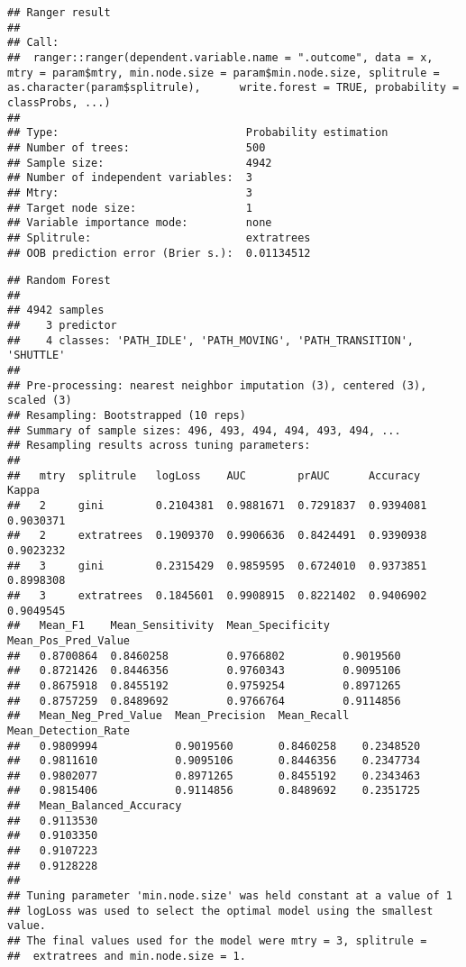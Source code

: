 \documentclass[]{article}
\begin{document}
\begin{verbatim}
## Ranger result
## 
## Call:
##  ranger::ranger(dependent.variable.name = ".outcome", data = x,      mtry = param$mtry, min.node.size = param$min.node.size, splitrule = as.character(param$splitrule),      write.forest = TRUE, probability = classProbs, ...) 
## 
## Type:                             Probability estimation 
## Number of trees:                  500 
## Sample size:                      4942 
## Number of independent variables:  3 
## Mtry:                             3 
## Target node size:                 1 
## Variable importance mode:         none 
## Splitrule:                        extratrees 
## OOB prediction error (Brier s.):  0.01134512
\end{verbatim}

\begin{verbatim}
## Random Forest 
## 
## 4942 samples
##    3 predictor
##    4 classes: 'PATH_IDLE', 'PATH_MOVING', 'PATH_TRANSITION', 'SHUTTLE' 
## 
## Pre-processing: nearest neighbor imputation (3), centered (3), scaled (3) 
## Resampling: Bootstrapped (10 reps) 
## Summary of sample sizes: 496, 493, 494, 494, 493, 494, ... 
## Resampling results across tuning parameters:
## 
##   mtry  splitrule   logLoss    AUC        prAUC      Accuracy   Kappa    
##   2     gini        0.2104381  0.9881671  0.7291837  0.9394081  0.9030371
##   2     extratrees  0.1909370  0.9906636  0.8424491  0.9390938  0.9023232
##   3     gini        0.2315429  0.9859595  0.6724010  0.9373851  0.8998308
##   3     extratrees  0.1845601  0.9908915  0.8221402  0.9406902  0.9049545
##   Mean_F1    Mean_Sensitivity  Mean_Specificity  Mean_Pos_Pred_Value
##   0.8700864  0.8460258         0.9766802         0.9019560          
##   0.8721426  0.8446356         0.9760343         0.9095106          
##   0.8675918  0.8455192         0.9759254         0.8971265          
##   0.8757259  0.8489692         0.9766764         0.9114856          
##   Mean_Neg_Pred_Value  Mean_Precision  Mean_Recall  Mean_Detection_Rate
##   0.9809994            0.9019560       0.8460258    0.2348520          
##   0.9811610            0.9095106       0.8446356    0.2347734          
##   0.9802077            0.8971265       0.8455192    0.2343463          
##   0.9815406            0.9114856       0.8489692    0.2351725          
##   Mean_Balanced_Accuracy
##   0.9113530             
##   0.9103350             
##   0.9107223             
##   0.9128228             
## 
## Tuning parameter 'min.node.size' was held constant at a value of 1
## logLoss was used to select the optimal model using the smallest value.
## The final values used for the model were mtry = 3, splitrule =
##  extratrees and min.node.size = 1.
\end{verbatim}
\end{document}
